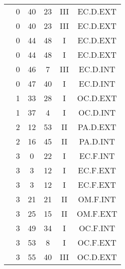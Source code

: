 \documentclass[12pt, a4paper]{article}
\begin{document}
\begin{multicols}{3}
{\begin{tabular}{c c c c c c}
	 	 	 	 & 0 & 40 & 23 & III & EC.D.EXT\\%
	 	 	 	 & 0 & 40 & 23 & III & EC.D.EXT\\%
	 	 	 	 & 0 & 44 & 48 & I & EC.D.EXT\\%
	 	 	 	 & 0 & 44 & 48 & I & EC.D.EXT\\%
	 	 	 	 & 0 & 46 & 7 & III & EC.D.INT\\%
	 	 	 	 & 0 & 47 & 40 & I & EC.D.INT\\%
	 	 	 	 & 1 & 33 & 28 & I & OC.D.EXT\\%
	 	 	 	 & 1 & 37 & 4 & I & OC.D.INT\\%
	 	 	 	 & 2 & 12 & 53 & II & PA.D.EXT\\%
	 	 	 	 & 2 & 16 & 45 & II & PA.D.INT\\%
	 	 	 	 & 3 & 0 & 22 & I & EC.F.INT\\%
	 	 	 	 & 3 & 3 & 12 & I & EC.F.EXT\\%
	 	 	 	 & 3 & 3 & 12 & I & EC.F.EXT\\%
	 	 	 	 & 3 & 21 & 21 & II & OM.F.INT\\%
	 	 	 	 & 3 & 25 & 15 & II & OM.F.EXT\\%
	 	 	 	 & 3 & 49 & 34 & I & OC.F.INT\\%
	 	 	 	 & 3 & 53 & 8 & I & OC.F.EXT\\%
	 	 	 	 & 3 & 55 & 40 & III & OC.D.EXT\\%
	 	 \end{tabular}
 	}
\end{multicols}
\end{document}
